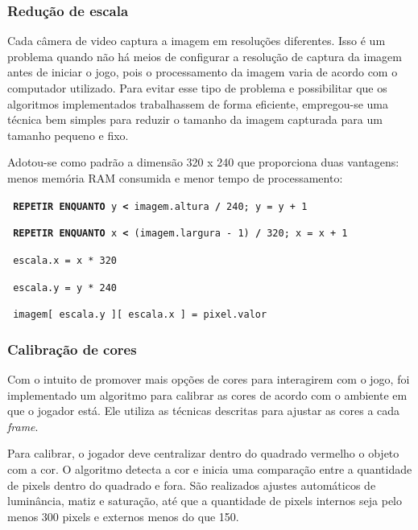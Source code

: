 \documentclass[12pt]{article}
\begin{document}
\subsubsection{Redu\c c\~ao de escala}
Cada c\^amera de video captura a imagem em resolu\c c\~oes diferentes. Isso \'e um problema quando n\~ao h\'a
meios de configurar a resolu\c c\~ao de captura da imagem antes de iniciar o jogo, pois o processamento da imagem
varia de acordo com o computador utilizado. Para evitar esse tipo de problema e possibilitar que os algoritmos implementados
trabalhassem de forma eficiente, empregou-se uma t\'ecnica bem simples para reduzir
o tamanho da imagem capturada para um tamanho pequeno e fixo.
 
Adotou-se como padr\~ao a dimens\~ao 320 x 240 que proporciona duas vantagens: menos mem\'oria RAM consumida
 e menor tempo de processamento:

\noindent \texttt{\footnotesize{ \textbf{REPETIR ENQUANTO} y \textbf{<} imagem.altura \textbf{/} 240; y = y + 1} }

\hspace{0.2cm} \texttt{\footnotesize{ \textbf{REPETIR ENQUANTO} x \textbf{<} (imagem.largura - 1) \textbf{/} 320; x = x + 1}}

\hspace{0.4cm} \texttt{\footnotesize{ escala.x = x * 320}}

\hspace{0.4cm} \texttt{\footnotesize{ escala.y = y * 240}}

\hspace{0.4cm} \texttt{\footnotesize{ imagem[ escala.y ][ escala.x ] = pixel.valor}}

\subsubsection{Calibra\c c\~ao de cores}
Com o intuito de promover mais op\c c\~oes de cores para interagirem com o jogo, foi implementado um
algoritmo para calibrar as cores de acordo com o ambiente em que o jogador est\'a. Ele utiliza as t\'ecnicas
descritas para ajustar as cores a cada \emph{frame}.

Para calibrar, o jogador deve centralizar dentro do quadrado vermelho o objeto com a cor. O algoritmo detecta a cor
e inicia uma compara\c c\~ao entre a quantidade de pixels dentro do quadrado e fora. S\~ao realizados ajustes autom\'aticos
de lumin\^ancia, matiz e satura\c c\~ao, at\'e que a quantidade de pixels internos seja pelo menos 300 pixels e externos menos do que 150.
\end{document}
